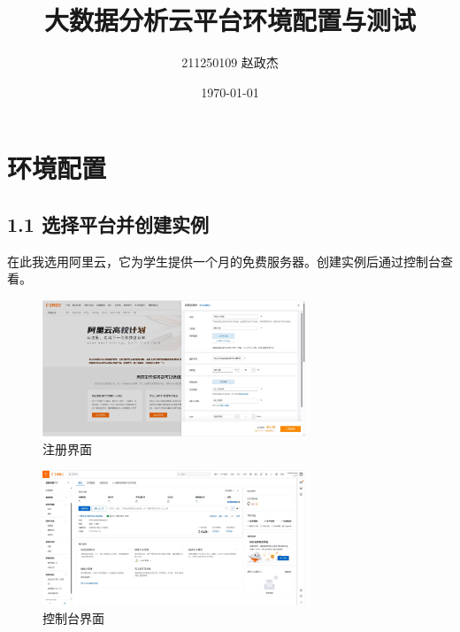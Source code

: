 \documentclass{article}
\begin{document}
\title{大数据分析云平台环境配置与测试}
\author{211250109 赵政杰}
\date{\today}
\maketitle

\section{环境配置}

\subsection*{1.1 选择平台并创建实例}
在此我选用阿里云，它为学生提供一个月的免费服务器。创建实例后通过控制台查看。
\begin{figure}[H]
    \centering
    \includegraphics[width=0.7\textwidth]{./pic/1.jpg}
    \caption{注册界面}
\end{figure}
\begin{figure}[H]
    \centering
    \includegraphics[width=0.7\textwidth]{./pic/2.jpg}
    \caption{控制台界面}
\end{figure}
\end{document}

